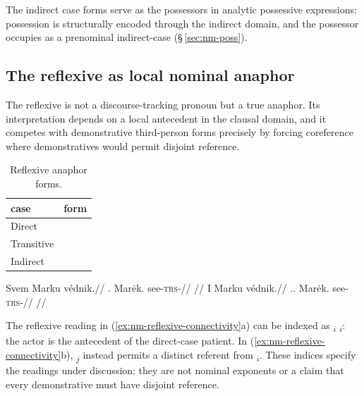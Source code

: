 The indirect case forms serve as the possessors in analytic possessive
expressions: possession is structurally encoded through the indirect
domain, and the possessor occupies  as a prenominal indirect-case
 (§\,\ref{sec:nm-poss}).

\pex
\a {} 
\a {} 
\xe

\subsection{The reflexive as local nominal anaphor}
\label{sec:nm-pron-refl}

The reflexive is not a discourse-tracking pronoun but a true anaphor. Its
interpretation depends on a local antecedent in the clausal domain, and it
competes with demonstrative third-person forms precisely by forcing coreference
where demonstratives would permit disjoint reference.

\begin{table}[ht]
  \footnotesize
  \caption{Reflexive anaphor forms.}
  \label{tab:nm-reflexive}
  \begin{tabularx}{0.5\textwidth}{L l}
    \toprule
    {\sc case} & {\sc form} \\
    \midrule
    Direct     &  \\
    Transitive &   \\
    Indirect   &   \\
    \bottomrule
  \end{tabularx}
\end{table}

\pex\label{ex:nm-reflexive-connectivity}
\a
\begingl
\gla Svem Marku védnik.//
\glb \Refl{}.\Dir{} Marėk.\Trs{} see-\textsc{trs}-\Pf{}//
\glft {}//
\endgl
\a
\begingl
\gla I Marku védnik.//
.\Dist{}.\Dir{} Marėk.\Trs{} see-\textsc{trs}-\Pf{}//
\glft {}//
\endgl
\xe

\noindent The reflexive reading in (\ref{ex:nm-reflexive-connectivity}a)
can be indexed as \textsubscript{$i$}
\textsubscript{$i$}: the actor is the antecedent of the
direct-case patient. In (\ref{ex:nm-reflexive-connectivity}b),
\textsubscript{$j$} instead permits a distinct referent from
\textsubscript{$i$}. These indices specify the readings under
discussion; they are not nominal exponents or a claim that every demonstrative
must have disjoint reference.

